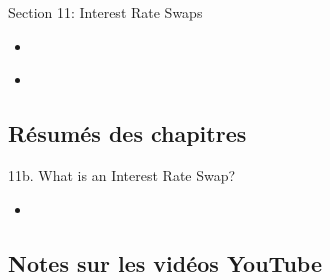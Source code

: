 \begin{ASM_chapter}
Section 11: Interest Rate Swaps
\begin{itemize}
	\item	{}
\end{itemize}
\end{ASM_chapter}

\begin{YTB_vids}
\begin{itemize}
	\item	
\end{itemize}
\end{YTB_vids}

\subsection{Résumés des chapitres}

\begin{CHPT_SUMM_AUTO}[label = {L.-11b}]{11b. What is an Interest Rate Swap?}
	\begin{itemize}
		\item	
	\end{itemize}
\end{CHPT_SUMM_AUTO}

\subsection{Notes sur les vidéos YouTube}

